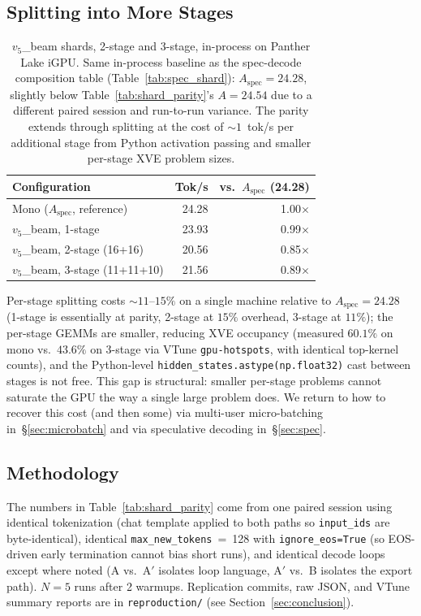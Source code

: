 \documentclass[11pt]{article}
\begin{document}
\subsection{Splitting into More Stages}

\begin{table}[ht]
\centering
\caption{$v_5$\_beam shards, 2-stage and 3-stage, in-process on Panther Lake iGPU. Same in-process baseline as the spec-decode composition table (Table~\ref{tab:spec_shard}): $A_{\text{spec}}=24.28$, slightly below Table~\ref{tab:shard_parity}'s $A=24.54$ due to a different paired session and run-to-run variance. The parity extends through splitting at the cost of ${\sim}1$~tok/s per additional stage from Python activation passing and smaller per-stage XVE problem sizes.}
\label{tab:shard_stages}
\begin{tabular}{@{}lrr@{}}
\toprule
Configuration & Tok/s & vs.\ $A_{\text{spec}}$ (24.28) \\
\midrule
Mono ($A_{\text{spec}}$, reference) & 24.28 & 1.00$\times$ \\
$v_5$\_beam, 1-stage             & 23.93 & 0.99$\times$ \\
$v_5$\_beam, 2-stage (16+16)     & 20.56 & 0.85$\times$ \\
$v_5$\_beam, 3-stage (11+11+10)  & 21.56 & 0.89$\times$ \\
\bottomrule
\end{tabular}
\end{table}

Per-stage splitting costs ${\sim}11$--$15\%$ on a single machine relative to $A_{\text{spec}}=24.28$ (1-stage is essentially at parity, 2-stage at $15\%$ overhead, 3-stage at $11\%$); the per-stage GEMMs are smaller, reducing XVE occupancy (measured $60.1\%$ on mono vs.\ $43.6\%$ on 3-stage via VTune \texttt{gpu-hotspots}, with identical top-kernel counts), and the Python-level \texttt{hidden\_states.astype(np.float32)} cast between stages is not free. This gap is structural: smaller per-stage problems cannot saturate the GPU the way a single large problem does. We return to how to recover this cost (and then some) via multi-user micro-batching in~\S\ref{sec:microbatch} and via speculative decoding in~\S\ref{sec:spec}.

\subsection{Methodology}

The numbers in Table~\ref{tab:shard_parity} come from one paired session using identical tokenization (chat template applied to both paths so \texttt{input\_ids} are byte-identical), identical \texttt{max\_new\_tokens}~=~128 with \texttt{ignore\_eos=True} (so EOS-driven early termination cannot bias short runs), and identical decode loops except where noted (A vs.\ A$'$ isolates loop language, A$'$ vs.\ B isolates the export path). $N\!=\!5$ runs after 2 warmups. Replication commits, raw JSON, and VTune summary reports are in \texttt{reproduction/} (see Section~\ref{sec:conclusion}).
\end{document}
